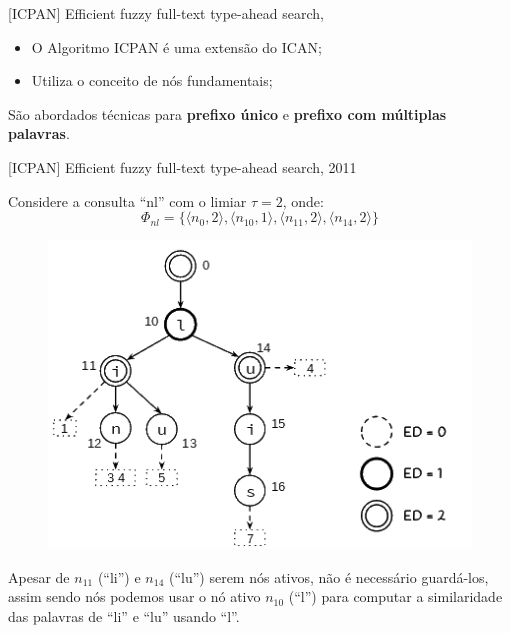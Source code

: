 \documentclass[11pt]{beamer}
\begin{document}
\begin{frame}{[ICPAN] Efficient fuzzy full-text type-ahead search, \cite{IPCAN}}

    \large
    \begin{itemize}
        \item O Algoritmo ICPAN é uma extensão do ICAN;
        \item Utiliza o conceito de nós fundamentais;
    \end{itemize}
    
    São abordados técnicas para \textbf{prefixo único} e \textbf{prefixo com múltiplas palavras}.
    
\end{frame}

\begin{frame}{[ICPAN] Efficient fuzzy full-text type-ahead search, 2011}
    
    Considere a consulta ``nl'' com o limiar $\tau = 2$, onde: \[\Phi_{nl} = \big\{ \big \langle n_{0}, 2 \big \rangle, \big \langle n_{10}, 1 \big \rangle, \big \langle n_{11}, 2 \big \rangle, \big \langle n_{14}, 2 \big \rangle \big\}\]
    
    \begin{figure}
      \includegraphics[scale=0.32]{pictures/ican_4.png}
      \centering
    \end{figure}
    
    Apesar de $n_{11}$ (``li'') e $n_{14}$ (``lu'') serem nós ativos, não é necessário guardá-los, assim sendo nós podemos usar o nó ativo $n_{10}$ (``l'') para computar a similaridade das palavras de ``li'' e ``lu'' usando ``l''.
    
\end{frame}
\end{document}
